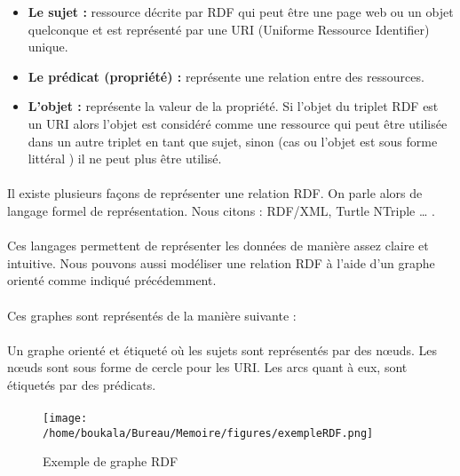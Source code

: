 \documentclass[12pt, a4paper, oneside]{book}
\begin{document}
\begin{itemize}

\item \textbf{Le sujet : }ressource décrite par RDF qui peut être une page web ou un objet quelconque et est représenté par une URI (Uniforme Ressource Identifier) unique.
\item \textbf{Le prédicat (propriété) : }représente une relation entre des ressources.
\item \textbf{L'objet : }représente la valeur de la propriété. Si l'objet du triplet RDF est un URI alors
l'objet est considéré comme une ressource qui peut être utilisée dans un autre triplet en tant
que sujet, sinon (cas ou l'objet est sous forme littéral ) il ne peut plus être utilisé.

\end{itemize}

\paragraph{}
Il existe plusieurs façons de représenter une relation RDF. On parle alors de langage formel de représentation. Nous citons : RDF/XML, Turtle NTriple … .
\paragraph{}
Ces langages permettent de représenter les données de manière assez claire et intuitive.
Nous pouvons aussi modéliser une relation RDF à l'aide d'un graphe orienté comme indiqué précédemment.

\paragraph{}
Ces graphes sont représentés de la manière suivante : 


\paragraph{}
Un graphe orienté et étiqueté où les sujets sont représentés par des nœuds. Les nœuds sont sous forme de cercle pour les URI.
Les arcs quant à eux, sont étiquetés par des prédicats.

\paragraph{}

\begin{figure}[h!]
\begin{center}
\texttt{[image: /home/boukala/Bureau/Memoire/figures/exempleRDF.png]}
\caption{Exemple de graphe RDF}
\end{center}
\end{figure}
\end{document}
